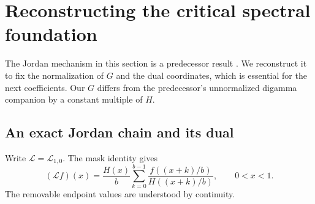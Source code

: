 \documentclass[11pt,a4paper]{article}
\numberwithin{equation}{section}
\theoremstyle{definition}
\theoremstyle{remark}
\newcommand{\Lop}{\mathcal L}
\begin{document}
\section{Reconstructing the critical spectral foundation}
\label{sec:jordan}
The Jordan mechanism in this section is a predecessor result
\cite{CriticalRepo}. We reconstruct it to fix the normalization of $G$
and the dual coordinates, which is essential for the next coefficients.
Our $G$ differs from the predecessor's unnormalized digamma companion by
a constant multiple of $H$.

\subsection{An exact Jordan chain and its dual}
Write $\Lop=\Lop_{1,0}$. The mask identity gives
\begin{equation}
 (\Lop f)(x)=\frac{H(x)}b\sum_{k=0}^{b-1}
             \frac{f((x+k)/b)}{H((x+k)/b)},\qquad 0<x<1.
 \label{eq:conjugacy}
\end{equation}
The removable endpoint values are understood by continuity.
\end{document}
